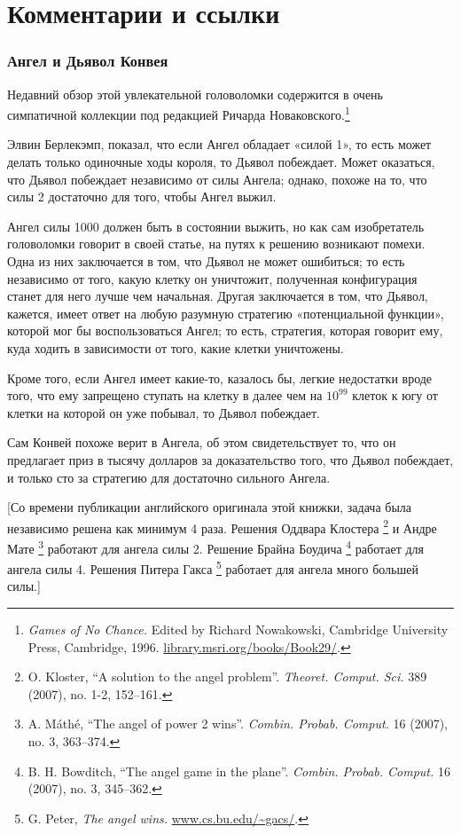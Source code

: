 \section*{Комментарии и ссылки}

\subsubsection*{Ангел и Дьявол Конвея}

Недавний обзор этой увлекательной головоломки содержится в очень симпатичной коллекции под редакцией Ричарда Новаковского.\footnote{\emph{Games of No Chance.} Edited by Richard Nowakowski, Cambridge University Press, Cambridge, 1996. \href{http://library.msri.org/books/Book29/}{\url{library.msri.org/books/Book29/}}.} 

Элвин Берлекэмп,  показал, что если Ангел обладает «силой 1», то есть может делать только одиночные ходы короля, то Дьявол побеждает.
Может оказаться, что Дьявол побеждает независимо от силы Ангела; 
однако, похоже на то, что силы 2 достаточно для того, чтобы Ангел выжил.

Ангел силы 1000 должен быть в состоянии выжить, но как сам изобретатель головоломки говорит в своей статье, на путях к решению возникают помехи.
Одна из них заключается в том, что Дьявол не может ошибиться;
то есть независимо от того, какую клетку он уничтожит, полученная конфигурация станет для него лучше чем начальная.
Другая заключается в том, что Дьявол, кажется, имеет ответ на любую разумную стратегию «потенциальной функции», которой мог бы воспользоваться Ангел;
то есть, стратегия, которая говорит ему, куда ходить в зависимости от того, какие клетки уничтожены. %

Кроме того, если Ангел имеет какие-то, казалось бы, легкие недостатки вроде того, что ему запрещено ступать на клетку в далее чем на $10^{99}$ клеток к югу от клетки на которой он уже побывал, то Дьявол побеждает.

Сам Конвей похоже верит в Ангела, об этом свидетельствует то, что он предлагает приз в тысячу долларов за доказательство того, что Дьявол побеждает, и только сто за стратегию для достаточно сильного Ангела.

[Со времени публикации английского оригинала этой книжки, задача была независимо решена как минимум 4 раза.
Решения Оддвара Клостера%
\footnote{
O. Kloster, 
``A solution to the angel problem''.
\emph{Theoret. Comput. Sci.} 389 (2007), no. 1-2, 152--161.}
и Андре Мате%
\footnote{
A. Máthé, 
``The angel of power 2 wins''. 
\emph{Combin. Probab. Comput.} 16 (2007), no. 3, 363–374.}
работают для ангела силы 2.
Решение Брайна Боудича%
\footnote{B. H. Bowditch, ``The angel game in the plane''. \emph{Combin. Probab. Comput.} 16 (2007), no. 3, 345--362.}
работает для ангела силы 4.
Решения Питера Гакса%
\footnote{G. Peter, \emph{The angel wins.} \href{https://www.cs.bu.edu/~gacs/papers/angel.pdf}{\url{www.cs.bu.edu/~gacs/}}.}
работает для ангела много большей силы.]

